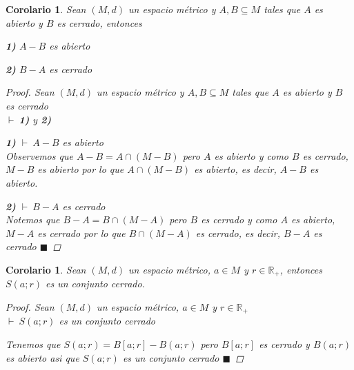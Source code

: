 \documentclass[oneside]{book} %
\theoremstyle{Teorema}
\newtheorem{Corolario}[Definicion]{Corolario}
\theoremstyle{Ejemplos}
\theoremstyle{[Obs]}
\renewcommand{\{}{\left\lbrace} %
\renewcommand{\}}{\right\rbrace} %
\newcommand{\n}{\cap} %
\renewcommand{\sc}{\subseteq} %
\newcommand{\R}{\mathbb{R}} %
\renewcommand{\qed}{$\blacksquare$} %
\newcommand{\pd}{$\vdash\ $} %
\begin{document}
			\begin{Corolario}\setlength{\parindent}{0em}
			
				Sean $(M, d)$ un espacio métrico y $A, B \sc M$ tales que $A$ es abierto y $B$ es cerrado, entonces 

				\textbf{1)} $A - B$ es abierto 

				\textbf{2)} $B - A$ es cerrado 

				\begin{proof}
					
					Sean $(M, d)$ un espacio métrico y $A, B \sc M$ tales que $A$ es abierto y $B$ es cerrado \\ 
					\pd \textbf{1)} y \textbf{2)}

					\textbf{1)} \pd $A - B$ es abierto \\
					Observemos que $A - B = A \n (M - B)$ pero $A$ es abierto y como $B$ es cerrado, $M - B$ es abierto por lo que $A \n (M - B)$ es abierto, es decir, $A - B$ es abierto.

					\textbf{2)} \pd $B - A$ es cerrado \\
					Notemos que $B - A = B \n (M - A)$ pero $B$ es cerrado y como $A$ es abierto, $M - A$ es cerrado por lo que $B \n (M - A)$ es cerrado, es decir, $B - A$ es cerrado \qed

				\end{proof}
			
			\end{Corolario}

			\begin{Corolario}\setlength{\parindent}{0em}
			
				Sean $(M, d)$ un espacio métrico, $a \in M$ y $r \in \R_{+}$, entonces $S(a;r)$ es un conjunto cerrado.

				\begin{proof}
					
					Sean $(M, d)$ un espacio métrico, $a \in M$ y $r \in \R_{+}$ \\ 
					\pd $S(a;r)$ es un conjunto cerrado 

					Tenemos que $S(a;r) = B[a;r] - B(a;r)$ pero $B[a;r]$ es cerrado y $B(a;r)$ es abierto asi que $S(a;r)$ es un conjunto cerrado \qed

				\end{proof}
			
			\end{Corolario}
\end{document}
